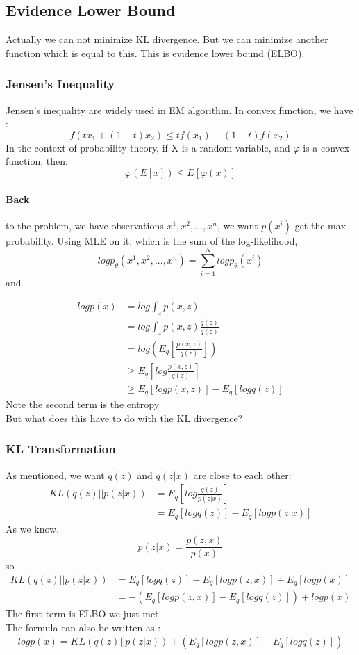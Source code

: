 \documentclass{article}
\begin{document}
\subsection{Evidence Lower Bound}
Actually we can not minimize KL divergence. But we can minimize another function which is equal to this. This is evidence lower bound (ELBO).
\subsubsection{Jensen's Inequality}
Jensen's inequality are widely used in EM algorithm. In convex function, we have :
$$f(tx_{1}+(1-t)x_{2})\leq tf(x_{1})+(1-t)f(x_{2}) $$ 
In the context of probability theory, if X is a random variable, and $\varphi$ is a convex function, then:
$$\varphi(E[x]) \leq E[\varphi(x)]$$
\paragraph{Back} to the problem, we have observations $x^{1},x^{2},...,x^{n}$, we want $p(x^{i})$ get the max probability. Using MLE on it, which is the sum of the log-likelihood,
$$logp_{\theta}(x^{1},x^{2},...,x^{n})=\sum_{i=1}^{N}logp_{\theta} (x^{i})$$
and

\begin{align*}
logp(x) & =log \int_{z}p(x,z) \\
 &= log \int_{z}p(x,z)\frac{q(z)}{q(z)} \\
 &= log \left( E_{q} \left[ \frac{p(x,z)}{q(z)} \right] \right) \\
 &\geq E_{q} \left[ log \frac{p(x,z)}{q(z)} \right] \\
 &\geq E_{q}[logp(x,z)]-E_{q}[logq(z)]
\end{align*}
Note the second term is the entropy\\
But what does this have to do with the KL divergence? 
\subsubsection{KL Transformation}
As mentioned, we want $q(z)$ and $q(z|x)$ are close to each other:
\begin{align*}
KL(q(z)||p(z|x)) &= E_{q}\left[ log \frac{q(z)}{p(z|x)} \right] \\
&=E_{q}[logq(z)]-E_{q}[logp(z|x)]
\end{align*}
As we know,
$$p(z|x)=\frac{p(z,x)}{p(x)}$$
so 
\begin{align*}
KL(q(z)||p(z|x)) &= E_{q}[logq(z)]-E_{q}[logp(z,x)]+E_{q}[logp(x)] \\
&= -(E_{q}[logp(z,x)]-E_{q}[logq(z)])+logp(x)
\end{align*}
The first term is ELBO we just met.\\
The formula can also be written as :
$$logp(x)=KL(q(z)||p(z|x))+(E_{q}[logp(z,x)]-E_{q}[logq(z)])$$
\end{document}
